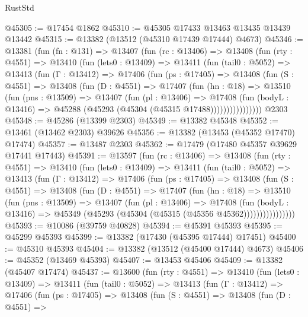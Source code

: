\begin{lexlean}{RustStd}
\begin{coremodule}
@45305 := @17454 @1862
@45310 := @45305 @17433 @13463 @13435 @13439 @13442
@45315 := @13382 (@13512 (@45310 @17439 @17444) @4673)
@45346 := @13381
    (fun (fn : @131) =>
    @13407
      (fun (rc : @13406) =>
      @13408
        (fun (rty : @4551) =>
        @13410
          (fun (lets0 : @13409) =>
          @13411
            (fun (tail0 : @5052) =>
            @13413
              (fun (Γ : @13412) =>
              @17406
                (fun (ps : @17405) =>
                @13408
                  (fun (S : @4551) =>
                  @13408
                    (fun (D : @4551) =>
                    @17407
                      (fun (hn : @18) =>
                      @13510
                        (fun (pns : @13509) =>
                        @13407
                          (fun (pl : @13406) =>
                          @17408
                            (fun (bodyL : @13416) =>
                            @45288 (@45293 (@45304 (@45315 @17488))))))))))))))))
    @2303
@45348 := @45286 (@13399 @2303)
@45349 := @13382 @45348
@45352 := @13461 (@13462 @2303) @39626
@45356 := @13382 (@13453 (@45352 @17470) @17474)
@45357 := @13487 @2303
@45362 := @17479 (@17480 @45357 @39629 @17441 @17443)
@45391 := @13597
    (fun (rc : @13406) =>
    @13408
      (fun (rty : @4551) =>
      @13410
        (fun (lets0 : @13409) =>
        @13411
          (fun (tail0 : @5052) =>
          @13413
            (fun (Γ : @13412) =>
            @17406
              (fun (ps : @17405) =>
              @13408
                (fun (S : @4551) =>
                @13408
                  (fun (D : @4551) =>
                  @17407
                    (fun (hn : @18) =>
                    @13510
                      (fun (pns : @13509) =>
                      @13407
                        (fun (pl : @13406) =>
                        @17408
                          (fun (bodyL : @13416) =>
                          @45349 (@45293 (@45304 (@45315 (@45356 @45362))))))))))))))))
@45393 := @10086 (@39759 @40828)
@45394 := @45391 @45393
@45395 := @45299 @45393
@45399 := @13382 (@17430 (@45395 @17444) @17451)
@45400 := @45310 @45393
@45404 := @13382 (@13512 (@45400 @17444) @4673)
@45406 := @45352 (@13469 @45393)
@45407 := @13453 @45406
@45409 := @13382 (@45407 @17474)
@45437 := @13600
    (fun (rty : @4551) =>
    @13410
      (fun (lets0 : @13409) =>
      @13411
        (fun (tail0 : @5052) =>
        @13413
          (fun (Γ : @13412) =>
          @17406
            (fun (ps : @17405) =>
            @13408
              (fun (S : @4551) =>
              @13408
                (fun (D : @4551) =>

\end{coremodule}
\end{lexlean}
